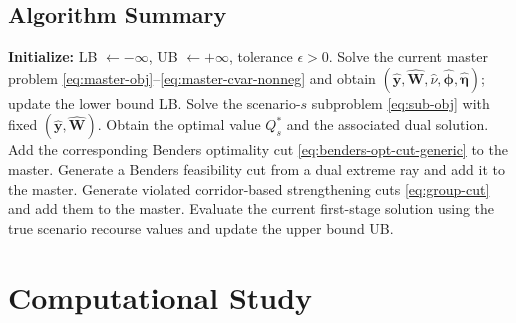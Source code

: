 \documentclass[final,3p,authoryear]{elsarticle}
\theoremstyle{definition}
\begin{document}
\subsection{Algorithm Summary}
\label{sec:alg-summary}


\begin{algorithm}[H]
\caption{Benders decomposition with corridor-based strengthening cuts}
\label{alg:benders}
\begin{algorithmic}[1]
\State \textbf{Initialize:}
LB $\gets -\infty$, UB $\gets +\infty$, tolerance $\epsilon > 0$.
\Repeat
    \State Solve the current master problem
    \eqref{eq:master-obj}--\eqref{eq:master-cvar-nonneg}
    and obtain
    $(\hat{\mathbf y},\hat{\mathbf W},\hat\nu,
    \hat{\boldsymbol\phi},\hat{\boldsymbol\eta})$;
    update the lower bound LB.
        \State Solve the scenario-$s$ subproblem
        \eqref{eq:sub-obj} with fixed
        $(\hat{\mathbf y},\hat{\mathbf W})$.
            \State Obtain the optimal value $Q_s^*$ and the associated dual
            solution.
                \State Add the corresponding Benders optimality cut
                \eqref{eq:benders-opt-cut-generic} to the master.
            \EndIf
        \Else
            \State Generate a Benders feasibility cut from a dual extreme
            ray and add it to the master.
        \EndIf
    \EndFor
    \State Generate violated corridor-based strengthening cuts
    \eqref{eq:group-cut} and add them to the master.
    \State Evaluate the current first-stage solution using the true
    scenario recourse values and update the upper bound UB.
\end{algorithmic}
\end{algorithm}



\section{Computational Study}
\label{sec:computational}
\end{document}
